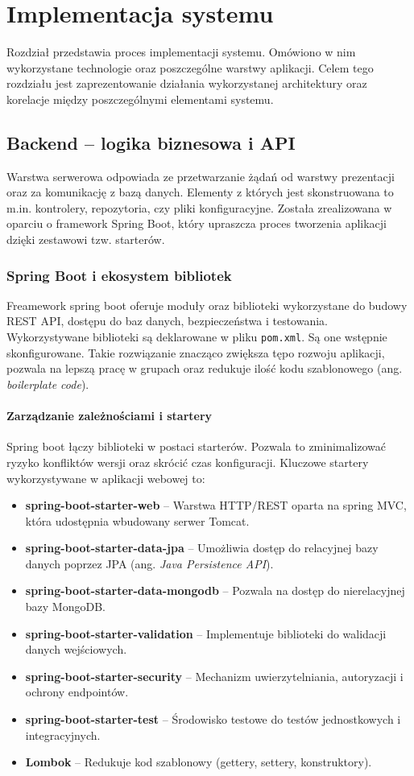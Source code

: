 \chapter{Implementacja systemu}
Rozdział  przedstawia proces implementacji systemu. Omówiono w nim wykorzystane technologie oraz poszczególne warstwy aplikacji. Celem tego rozdziału jest zaprezentowanie działania wykorzystanej architektury oraz korelacje między poszczególnymi elementami systemu.
\section{Backend – logika biznesowa i API}
Warstwa serwerowa odpowiada ze przetwarzanie żądań od warstwy prezentacji oraz za komunikację z bazą danych. Elementy z których jest skonstruowana to m.in. kontrolery, repozytoria, czy pliki konfiguracyjne. Została zrealizowana w oparciu o framework Spring Boot, który upraszcza proces tworzenia aplikacji dzięki zestawowi tzw. starterów.

\subsection*{Spring Boot i ekosystem bibliotek}
Freamework spring boot oferuje moduły oraz biblioteki wykorzystane do budowy REST API, dostępu do baz danych, bezpieczeństwa i testowania. Wykorzystywane biblioteki są deklarowane w pliku \texttt{pom.xml}. Są one wstępnie skonfigurowane. Takie rozwiązanie znacząco zwiększa tępo rozwoju aplikacji, pozwala na lepszą pracę w grupach oraz redukuje ilość kodu szablonowego (ang. \textit{boilerplate code}).
\subsubsection*{Zarządzanie zależnościami i startery}
Spring boot łączy biblioteki w postaci starterów. Pozwala to zminimalizować ryzyko konfliktów wersji oraz skrócić czas konfiguracji. Kluczowe startery wykorzystywane w aplikacji webowej to:
\begin{itemize}
	\item \textbf{spring-boot-starter-web} -- Warstwa HTTP/REST oparta na spring MVC, która udostępnia wbudowany serwer Tomcat. 
	\item \textbf{spring-boot-starter-data-jpa} -- Umożliwia dostęp do relacyjnej bazy danych poprzez JPA (ang. \textit{Java Persistence API}).
	\item \textbf{spring-boot-starter-data-mongodb} -- Pozwala na dostęp do nierelacyjnej bazy MongoDB. 
	\item \textbf{spring-boot-starter-validation} -- Implementuje biblioteki do walidacji danych wejściowych.
	\item \textbf{spring-boot-starter-security} -- Mechanizm uwierzytelniania, autoryzacji i ochrony endpointów.
	\item \textbf{spring-boot-starter-test} -- Środowisko testowe do testów jednostkowych i integracyjnych. 
	\item \textbf{Lombok} -- Redukuje kod szablonowy (gettery, settery, konstruktory).
\end{itemize}
